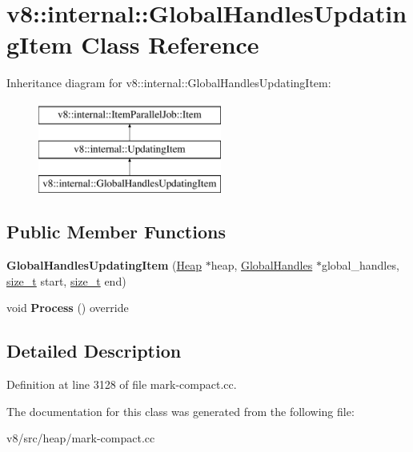 \hypertarget{classv8_1_1internal_1_1GlobalHandlesUpdatingItem}{}\section{v8\+:\+:internal\+:\+:Global\+Handles\+Updating\+Item Class Reference}
\label{classv8_1_1internal_1_1GlobalHandlesUpdatingItem}
Inheritance diagram for v8\+:\+:internal\+:\+:Global\+Handles\+Updating\+Item\+:\begin{figure}[H]
\begin{center}
\leavevmode
\includegraphics[height=3.000000cm]{classv8_1_1internal_1_1GlobalHandlesUpdatingItem}
\end{center}
\end{figure}
\subsection*{Public Member Functions}
\begin{DoxyCompactItemize}
\item 
\mbox{\label{classv8_1_1internal_1_1GlobalHandlesUpdatingItem_ab7e4a8724c64651acc0ff358b7475fe7}} 
{\bfseries Global\+Handles\+Updating\+Item} (\mbox{\hyperlink{classv8_1_1internal_1_1Heap}{Heap}} $\ast$heap, \mbox{\hyperlink{classv8_1_1internal_1_1GlobalHandles}{Global\+Handles}} $\ast$global\+\_\+handles, \mbox{\hyperlink{classsize__t}{size\+\_\+t}} start, \mbox{\hyperlink{classsize__t}{size\+\_\+t}} end)
\item 
\mbox{\label{classv8_1_1internal_1_1GlobalHandlesUpdatingItem_a37aab0f6e37f0be88d06dfd13ab74bf4}} 
void {\bfseries Process} () override
\end{DoxyCompactItemize}


\subsection{Detailed Description}


Definition at line 3128 of file mark-\/compact.\+cc.



The documentation for this class was generated from the following file\+:\begin{DoxyCompactItemize}
\item 
v8/src/heap/mark-\/compact.\+cc\end{DoxyCompactItemize}
